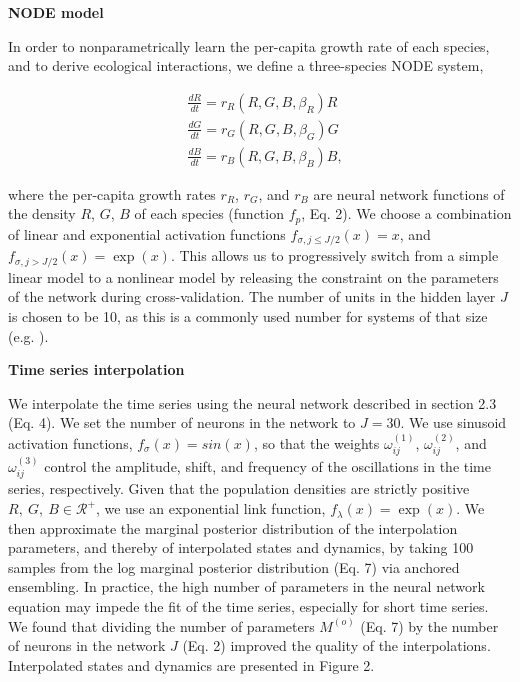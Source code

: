 \documentclass[11pt, oneside]{article}
\begin{document}
\textbf{NODE model}

In order to nonparametrically learn the per-capita growth rate of each species, and to derive ecological interactions, we define a three-species NODE system,

\vspace{-0.5cm}
\begin{equation} \begin{aligned}
	& \frac{dR}{dt} = r_R(R,G,B,\beta_R) R \\
	& \frac{dG}{dt} = r_G(R,G,B,\beta_G) G \\
	& \frac{dB}{dt} = r_B(R,G,B,\beta_B) B,
\end{aligned} \end{equation}

where the per-capita growth rates $r_R$, $r_G$, and $r_B$ are neural network functions of the density $R$, $G$, $B$ of each species (function $f_p$, Eq. 2).
We choose a combination of linear and exponential activation functions $f_{\sigma, j\leq J/2}(x) = x$, and $f_{\sigma, j>J/2}(x) = \exp(x)$.
This allows us to progressively switch from a simple linear model to a nonlinear model by releasing the constraint on the parameters of the network during cross-validation.
The number of units in the hidden layer $J$ is chosen to be 10, as this is a commonly used number for systems of that size (e.g. \cite{Wu2005,Bonnaffe2021a}). 

\textbf{Time series interpolation}

We interpolate the time series using the neural network described in section 2.3 (Eq. 4).
We set the number of neurons in the network to $J=30$.
We use sinusoid activation functions, $f_\sigma(x) = sin(x)$, so that the weights $\omega^{(1)}_{ij}$, $\omega^{(2)}_{ij}$, and $\omega^{(3)}_{ij}$ control the amplitude, shift, and frequency of the oscillations in the time series, respectively.
Given that the population densities are strictly positive $R,~G,~B \in \mathcal{R^{+}}$, we use an exponential link function, $f_\lambda(x) = \exp (x)$. 
We then approximate the marginal posterior distribution of the interpolation parameters, and thereby of interpolated states and dynamics, by taking 100 samples from the log marginal posterior distribution (Eq. 7) via anchored ensembling. 
In practice, the high number of parameters in the neural network equation may impede the fit of the time series, especially for short time series. 
We found that dividing the number of parameters $M^{(o)}$ (Eq. 7) by the number of neurons in the network $J$ (Eq. 2) improved the quality of the interpolations.
Interpolated states and dynamics are presented in Figure 2.
\end{document}
